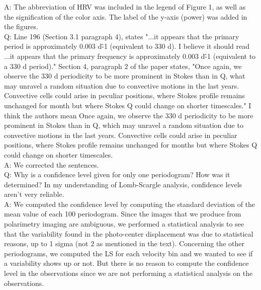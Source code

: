 \documentclass{article}
\begin{document}
A: The abbreviation of HRV was included in the legend of Figure 1, as well as the signification of the color axis. The label of the y-axis (power) was added in the figures.\\

Q: Line 196 (Section 3.1 paragraph 4), states "...it appears that the primary period is approximately 0.003 d\^-1 (equivalent to 330 d). I believe it should read ...it appears that the primary frequency is approximately 0.003 d\^-1 (equivalent to a 330 d period)." Section 4, paragraph 2 of the paper states, "Once again, we observe the 330 d periodicity to be more prominent in Stokes than in Q, what may unravel a random situation due to convective motions in the last years. Convective cells could arise in peculiar positions, where Stokes profile remains unchanged for month but where Stokes Q could change on shorter timescales." I think the authors mean Once again, we observe the 330 d periodicity to be more prominent in Stokes than in Q, which may unravel a random situation due to convective motions in the last years. Convective cells could arise in peculiar positions, where Stokes profile remains unchanged for months but where Stokes Q could change on shorter timescales.\\

A: We corrected the sentences. \\

Q: Why is a confidence level given for only one periodogram? How was it determined? In my
understanding of Lomb-Scargle analysis, confidence levels aren’t very reliable.\\

A: We computed the confidence level by computing the standard deviation of the mean value of each 100 periodogram. Since the images that we produce from polarimetry imaging are ambiguous, we performed a statistical analysis to see that the variability found in the photo-center displacement was due to statistical reasons, up to 1 sigma (not 2 as mentioned in the text). Concerning the other periodograms, we computed the LS for each velocity bin and we wanted to see if a variability shows up or not. But there is no reason to compute the confidence level in the observations since we are not performing a statistical analysis on the observations. 
\end{document}
